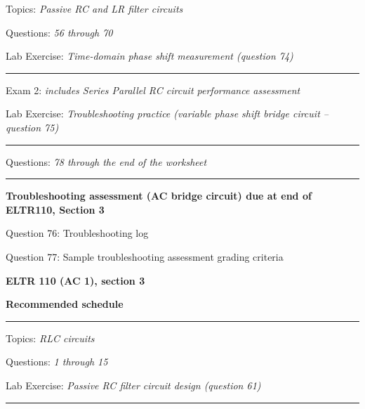 \hskip 10pt Topics: {\it Passive RC and LR filter circuits}
 
\hskip 10pt Questions: {\it 56 through 70}
 
\hskip 10pt Lab Exercise: {\it Time-domain phase shift measurement (question 74)}
 

\vskip 10pt
\hrule \vskip 5pt
\noindent
{}

\hskip 10pt Exam 2: {\it includes Series  Parallel RC circuit performance assessment}
 
\hskip 10pt Lab Exercise: {\it Troubleshooting practice (variable phase shift bridge circuit -- question 75)}
  
\vskip 10pt
\hrule \vskip 5pt
\noindent
{}

\hskip 10pt Questions: {\it 78 through the end of the worksheet}
 
\vskip 10pt
\hrule \vskip 5pt
\noindent
{}

\hskip 10pt {\bf Troubleshooting assessment (AC bridge circuit) due at end of ELTR110, Section 3}
 
\hskip 10pt Question 76: Troubleshooting log
 
\hskip 10pt Question 77: Sample troubleshooting assessment grading criteria
 
\vskip 10pt








\vfil \eject

\centerline{\bf ELTR 110 (AC 1), section 3} \bigskip 
 
\vskip 10pt

\noindent
{\bf Recommended schedule}

\vskip 5pt

\hrule \vskip 5pt
\noindent
{}

\hskip 10pt Topics: {\it RLC circuits}
 
\hskip 10pt Questions: {\it 1 through 15}
 
\hskip 10pt Lab Exercise: {\it Passive RC filter circuit design (question 61)}
 
\vskip 10pt
\hrule \vskip 5pt
\noindent
{}

